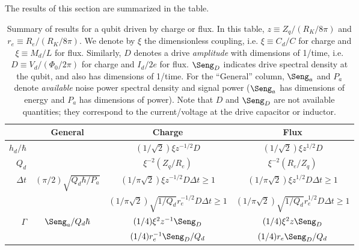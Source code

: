 The results of this section are summarized in the table.
\begin{table*}
  \centering
  \begin{tabular}{|r|c|c|c|}
    \hline
    & General & Charge & Flux \\
    \hline \hline
    $h_d/\hbar$
      &
      & $(1/\sqrt{2}) \xi z^{-1/2} D$
      & $(1/\sqrt{2}) \xi z^{1/2} D$
      \\
    \hline
    $Q_d$
      &
      & $\xi^{-2} (Z_q/R_e)$
      & $\xi^{-2} (R_e/Z_q)$
      \\
    \hline
    $\Delta t$
      & $(\pi/2) \sqrt{Q_d \hbar / P_a}$
      & $(1/\pi\sqrt{2}) \xi z^{-1/2} D \Delta t \geq 1$
      & $(1/\pi\sqrt{2}) \xi z^{1/2}  D \Delta t \geq 1$
      \\
      &
      & $(1/\pi\sqrt{2}) \sqrt{1/Q_d} r_e^{-1/2} D \Delta t \geq 1$
      & $(1/\pi\sqrt{2}) \sqrt{1/Q_d} r_e^{1/2}  D \Delta t \geq 1$
      \\
    \hline
    $\Gamma$
      & $\Seng_a / Q_d \hbar$
      & $(1/4) \xi^2 z^{-1} \Seng_D$
      & $(1/4) \xi^2 z      \Seng_D$
      \\
      &
      & $(1/4) r_e^{-1} \Seng_D / Q_d$
      & $(1/4) r_e      \Seng_D / Q_d$
      \\
    \hline
  \end{tabular}
  \caption{Summary of results for a qubit driven by charge or flux. In this table, $z\equiv Z_q/(R_K/8\pi)$ and $r_e \equiv R_e / (R_K/8\pi)$. We denote by $\xi$ the dimensionless coupling, i.e. $\xi \equiv C_d/C$ for charge and $\xi \equiv M_d/L$ for flux. Similarly, $D$ denotes a drive \emph{amplitude} with dimensions of 1/time, i.e. $D \equiv V_d/(\Phi_0 / 2\pi)$ for charge and $I_d/2e$ for flux. $\Seng_D$ indicates drive spectral density at the qubit, and also has dimensions of 1/time. For the ``General'' column, $\Seng_a$ and $P_a$ denote \emph{available} noise power spectral density and signal power ($\Seng_a$ has dimensions of energy and $P_a$ has dimensions of power). Note that $D$ and $\Seng_D$ are not available quantities; they correspond to the current/voltage at the drive capacitor or inductor.}
\end{table*}
